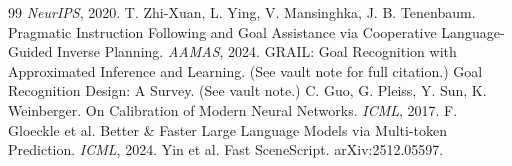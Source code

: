 \documentclass[11pt]{article}
\begin{document}
\begin{thebibliography}{99}
\emph{NeurIPS}, 2020.
 T. Zhi-Xuan, L. Ying, V. Mansinghka, J. B. Tenenbaum.
Pragmatic Instruction Following and Goal Assistance via Cooperative
Language-Guided Inverse Planning. \emph{AAMAS}, 2024.
 GRAIL: Goal Recognition with Approximated Inference and
Learning. (See vault note for full citation.)
 Goal Recognition Design: A Survey. (See vault note.)
 C. Guo, G. Pleiss, Y. Sun, K. Weinberger. On Calibration of
Modern Neural Networks. \emph{ICML}, 2017.
 F. Gloeckle et al. Better \& Faster Large Language Models via
Multi-token Prediction. \emph{ICML}, 2024.
 Yin et al. Fast SceneScript. arXiv:2512.05597.
\end{thebibliography}
\end{document}
